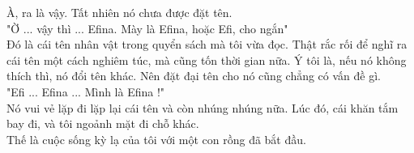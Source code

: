 	À, ra là vậy. Tất nhiên nó chưa được đặt tên. \\
	
	"Ờ ... vậy thì ... Efina. Mày là Efina, hoặc Efi, cho ngắn" \\
	
	Đó là cái tên nhân vật trong quyển sách mà tôi vừa đọc. Thật rắc rối để nghĩ ra cái tên một cách nghiêm túc, mà cũng tốn thời gian nữa. Ý tôi là, nếu nó không thích thì, nó đổi tên khác. Nên đặt đại tên cho nó cũng chẳng có vấn đề gì. \\
	
	
	"Efi ... Efina ... Mình là Efina !" \\
	
	Nó vui vẻ lặp đi lặp lại cái tên và còn nhúng nhúng nữa. Lúc đó, cái khăn tắm bay đi, và tôi ngoảnh mặt đi chỗ khác. \\
	
	Thế là cuộc sống kỳ lạ của tôi với một con rồng đã bắt đầu.\\
